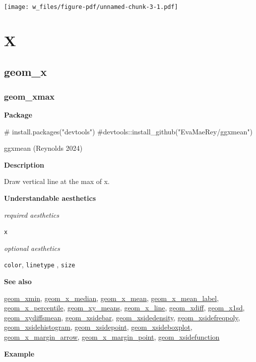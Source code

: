 \documentclass[
  letterpaper,
  DIV=11,
  numbers=noendperiod]{scrreprt}
\newenvironment{Shaded}{\begin{snugshade}}{\end{snugshade}}
\newcommand{\CommentTok}[1]{\textcolor[rgb]{0.37,0.37,0.37}{#1}}
\begin{document}
\texttt{[image: w\_files/figure-pdf/unnamed-chunk-3-1.pdf]}

\part{X}

\chapter{geom\_x}\label{sec-x}

\section{geom\_xmax}\label{xmax}

\textbf{Package}

\begin{Shaded}
\begin{Highlighting}[]
\CommentTok{\# install.packages("devtools")}
\CommentTok{\#devtools::install\_github("EvaMaeRey/ggxmean")}
\end{Highlighting}
\end{Shaded}

ggxmean (Reynolds 2024)

\textbf{Description}

Draw vertical line at the max of x.

\textbf{Understandable aesthetics}

\emph{required aesthetics}

\texttt{x}

\emph{optional aesthetics}

\texttt{color}, \texttt{linetype} , \texttt{size}

\textbf{See also}

\href{@xmin}{geom\_xmin}, \href{@x_median}{geom\_x\_median},
\href{@x_mean}{geom\_x\_mean},
\href{@x_mean_label}{geom\_x\_mean\_label},
\href{@x_percentile}{geom\_x\_percentile},
\href{@xy_means}{geom\_xy\_means}, \href{@x_line}{geom\_x\_line},
\href{@xdiff}{geom\_xdiff}, \href{@x1sd}{geom\_x1sd},
\href{@xydiffsmean}{geom\_xydiffsmean},
\href{@xsidebar}{geom\_xsidebar},
\href{@xsidedensity}{geom\_xsidedensity},
\href{@xsidefreqpoly}{geom\_xsidefreqpoly},
\href{@xsidehistogram}{geom\_xsidehistogram},
\href{@xsidepoint}{geom\_xsidepoint},
\href{@xsideboxplot}{geom\_xsideboxplot},
\href{@x_margin_arrow}{geom\_x\_margin\_arrow},
\href{@x_margin_point}{geom\_x\_margin\_point},
\href{@xsidefunction}{geom\_xsidefunction}

\textbf{Example}
\end{document}
